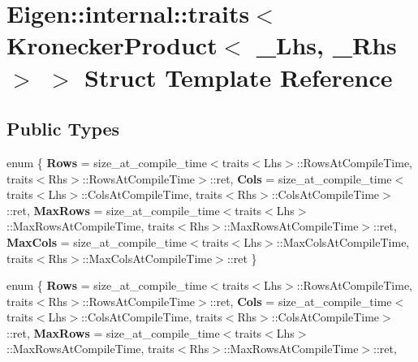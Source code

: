 \hypertarget{struct_eigen_1_1internal_1_1traits_3_01_kronecker_product_3_01___lhs_00_01___rhs_01_4_01_4}{}\section{Eigen\+:\+:internal\+:\+:traits$<$ Kronecker\+Product$<$ \+\_\+\+Lhs, \+\_\+\+Rhs $>$ $>$ Struct Template Reference}
\label{struct_eigen_1_1internal_1_1traits_3_01_kronecker_product_3_01___lhs_00_01___rhs_01_4_01_4}
\subsection*{Public Types}
\begin{DoxyCompactItemize}
\item 
\mbox{\label{struct_eigen_1_1internal_1_1traits_3_01_kronecker_product_3_01___lhs_00_01___rhs_01_4_01_4_a6260c1a62488f9f386dd99bf49890341}} 
enum \{ {\bfseries Rows} = size\+\_\+at\+\_\+compile\+\_\+time$<$traits$<$Lhs$>$\+:\+:Rows\+At\+Compile\+Time, traits$<$Rhs$>$\+:\+:Rows\+At\+Compile\+Time$>$\+:\+:ret, 
{\bfseries Cols} = size\+\_\+at\+\_\+compile\+\_\+time$<$traits$<$Lhs$>$\+:\+:Cols\+At\+Compile\+Time, traits$<$Rhs$>$\+:\+:Cols\+At\+Compile\+Time$>$\+:\+:ret, 
{\bfseries Max\+Rows} = size\+\_\+at\+\_\+compile\+\_\+time$<$traits$<$Lhs$>$\+:\+:Max\+Rows\+At\+Compile\+Time, traits$<$Rhs$>$\+:\+:Max\+Rows\+At\+Compile\+Time$>$\+:\+:ret, 
{\bfseries Max\+Cols} = size\+\_\+at\+\_\+compile\+\_\+time$<$traits$<$Lhs$>$\+:\+:Max\+Cols\+At\+Compile\+Time, traits$<$Rhs$>$\+:\+:Max\+Cols\+At\+Compile\+Time$>$\+:\+:ret
 \}
\item 
\mbox{\label{struct_eigen_1_1internal_1_1traits_3_01_kronecker_product_3_01___lhs_00_01___rhs_01_4_01_4_af2270b9f4e8afbd0bc5f1ee5f352ed8c}} 
enum \{ {\bfseries Rows} = size\+\_\+at\+\_\+compile\+\_\+time$<$traits$<$Lhs$>$\+:\+:Rows\+At\+Compile\+Time, traits$<$Rhs$>$\+:\+:Rows\+At\+Compile\+Time$>$\+:\+:ret, 
{\bfseries Cols} = size\+\_\+at\+\_\+compile\+\_\+time$<$traits$<$Lhs$>$\+:\+:Cols\+At\+Compile\+Time, traits$<$Rhs$>$\+:\+:Cols\+At\+Compile\+Time$>$\+:\+:ret, 
{\bfseries Max\+Rows} = size\+\_\+at\+\_\+compile\+\_\+time$<$traits$<$Lhs$>$\+:\+:Max\+Rows\+At\+Compile\+Time, traits$<$Rhs$>$\+:\+:Max\+Rows\+At\+Compile\+Time$>$\+:\+:ret, 

\end{DoxyCompactItemize}
